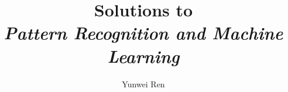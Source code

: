 

\title{Solutions to \\\textit{Pattern Recognition and Machine Learning}}
\author{Yunwei Ren}
\date{}


\maketitle
\tableofcontents

\newpage




